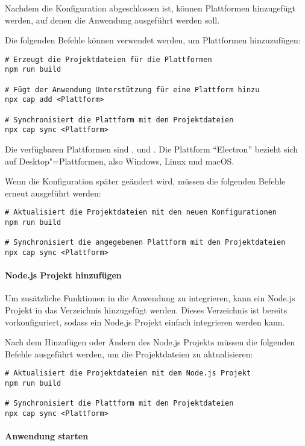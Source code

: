 Nachdem die Konfiguration abgeschlossen ist, können Plattformen hinzugefügt werden, auf denen die Anwendung ausgeführt werden soll.

Die folgenden Befehle können verwendet werden, um Plattformen hinzuzufügen:

\begin{verbatim}
# Erzeugt die Projektdateien für die Plattformen
npm run build

# Fügt der Anwendung Unterstützung für eine Plattform hinzu
npx cap add <Plattform>

# Synchronisiert die Plattform mit den Projektdateien
npx cap sync <Plattform>
\end{verbatim}

Die verfügbaren Plattformen sind ,  und .
Die Plattform \enquote{Electron} bezieht sich auf Desktop"=Plattformen, also Windows, Linux und macOS.

Wenn die Konfiguration später geändert wird, müssen die folgenden Befehle erneut ausgeführt werden:

\begin{verbatim}
# Aktualisiert die Projektdateien mit den neuen Konfigurationen
npm run build

# Synchronisiert die angegebenen Plattform mit den Projektdateien
npx cap sync <Plattform>
\end{verbatim}

\paragraph{Node.js Projekt hinzufügen}

Um zusätzliche Funktionen in die Anwendung zu integrieren, kann ein Node.js Projekt in das Verzeichnis  hinzugefügt werden.
Dieses Verzeichnis ist bereits vorkonfiguriert, sodass ein Node.js Projekt einfach integrieren werden kann.

Nach dem Hinzufügen oder Ändern des Node.js Projekts müssen die folgenden Befehle ausgeführt werden, um die Projektdateien zu aktualisieren:

\begin{verbatim}
# Aktualisiert die Projektdateien mit dem Node.js Projekt
npm run build

# Synchronisiert die Plattform mit den Projektdateien
npx cap sync <Plattform>
\end{verbatim}

\newpage

\paragraph{Anwendung starten}

